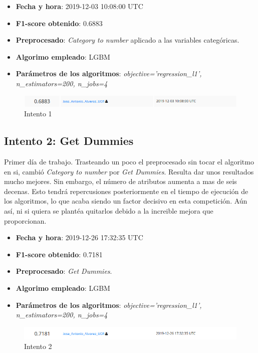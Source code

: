 \documentclass[11pt,a4paper]{article}
\begin{document}
	\begin{itemize}
		\item \textbf{Fecha y hora}: 2019-12-03 10:08:00 UTC
		\item \textbf{F1-score obtenido}: 0.6883
		\item \textbf{Preprocesado}: \emph{Category to number} aplicado a las variables categóricas.
		\item \textbf{Algorimo empleado}: LGBM
		\item \textbf{Parámetros de los algoritmos}: \emph{objective='regression\_l1', n\_estimators=200, n\_jobs=4}
	\end{itemize}
	
	\begin{figure}[H] 
		\centering
		\includegraphics[scale=0.6]{../capturas/T1}
		\caption{Intento 1}
	\end{figure}
	
	
	\subsection{Intento 2: Get Dummies}
	
	Primer día de trabajo. Trasteando un poco el preprocesado sin tocar el algoritmo en si, cambió \emph{Category to number} por \emph{Get Dummies}. Resulta dar unos resultados mucho mejores. Sin embargo, el número de atributos aumenta a mas de seis decenas. Esto tendrá repercusiones posteriormente en el tiempo de ejecución de los algoritmos, lo que acaba siendo un factor decisivo en esta competición. Aún así, ni si quiera se plantéa quitarlos debido a la increible mejora que proporcionan.
	
	\begin{itemize}
		\item \textbf{Fecha y hora}: 2019-12-26 17:32:35 UTC
		\item \textbf{F1-score obtenido}: 0.7181
		\item \textbf{Preprocesado}: \emph{Get Dummies}.
		\item \textbf{Algorimo empleado}: LGBM
		\item \textbf{Parámetros de los algoritmos}: \emph{objective='regression\_l1', n\_estimators=200, n\_jobs=4}
	\end{itemize}
	
	\begin{figure}[H] 
		\centering
		\includegraphics[scale=0.6]{../capturas/T2}
		\caption{Intento 2}
	\end{figure}
	
\end{document}
